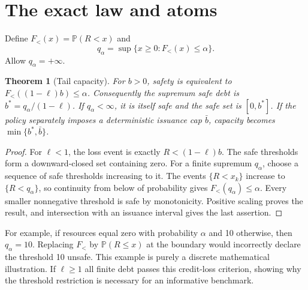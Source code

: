 \documentclass[11pt,a4paper]{article}
\newtheorem{theorem}{Theorem}[section]
\theoremstyle{definition}
\theoremstyle{remark}
\newcommand{\Prob}{\mathbb{P}}
\begin{document}
\section{The exact law and atoms}
Define $F_<(x)=\Prob(R<x)$ and
\[
 q_\alpha=\sup\{x\ge0:F_<(x)\le\alpha\}.
\]
Allow $q_\alpha=+\infty$.
\begin{theorem}[Tail capacity]
For $b>0$, safety is equivalent to $F_<((1-\ell)b)\le\alpha$. Consequently the supremum safe debt is
$b^*=q_\alpha/(1-\ell)$.
If $q_\alpha<\infty$, it is itself safe and the safe set is $[0,b^*]$. If the policy separately imposes a deterministic issuance cap $\bar b$, capacity becomes $\min\{b^*,\bar b\}$.
\end{theorem}
\begin{proof}
For $\ell<1$, the loss event is exactly $R<(1-\ell)b$. The safe thresholds form a downward-closed set containing zero. For a finite supremum $q_\alpha$, choose a sequence of safe thresholds increasing to it. The events $\{R<x_k\}$ increase to $\{R<q_\alpha\}$, so continuity from below of probability gives $F_<(q_\alpha)\le\alpha$. Every smaller nonnegative threshold is safe by monotonicity. Positive scaling proves the result, and intersection with an issuance interval gives the last assertion.
\end{proof}
For example, if resources equal zero with probability $\alpha$ and 10 otherwise, then $q_\alpha=10$. Replacing $F_<$ by $\Prob(R\le x)$ at the boundary would incorrectly declare the threshold 10 unsafe. This example is purely a discrete mathematical illustration. If $\ell\ge1$ all finite debt passes this credit-loss criterion, showing why the threshold restriction is necessary for an informative benchmark.
\end{document}
